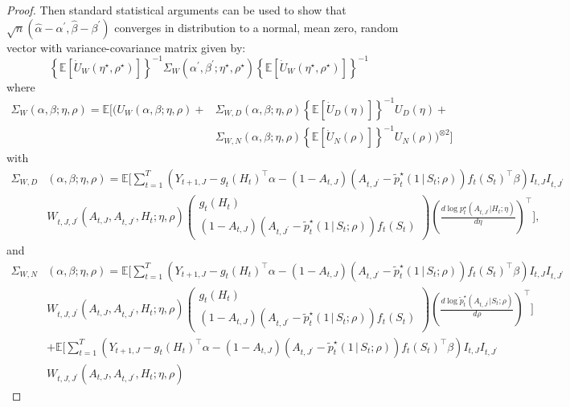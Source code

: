 \documentclass[supplementary, lineno]{biometrika}
\def\E{\mathbb{E}}
\def\given{\, | \,}
\begin{document}
\begin{proof}
Then standard statistical arguments can be used to show that $\sqrt{n}(\hat\alpha-\alpha^\prime, \hat\beta-\beta^\prime)$ converges in distribution to a normal, mean zero, random vector with variance-covariance matrix given by:
\begin{equation*}
    \left\{ \E \left[\dot U_W(\eta^\star, \rho^\star) \right]\right\}^{-1} \Sigma_W(\alpha^\prime,\beta^\prime;\eta^\star, \rho^\star) \left\{ \E \left[\dot U_W(\eta^\star, \rho^\star) \right]\right\}^{-1}
\end{equation*}
where
\begin{align*}
    \Sigma_W(\alpha,\beta;\eta, \rho) = \E \Big[\Big(U_W(\alpha,\beta;\eta, \rho) + &\Sigma_{W,D}(\alpha,\beta;\eta, \rho) \left\{\E[\dot U_D(\eta)] \right\}^{-1} U_D(\eta) + \nonumber \\ &\Sigma_{W,N}(\alpha,\beta;\eta, \rho)\left\{\E[\dot U_N(\rho)] \right\}^{-1} U_N(\rho) \Big)^ {\otimes 2} \Big]
\end{align*}
with
\begin{align*}
    \Sigma_{W,D}&(\alpha,\beta ; \eta, \rho)
    = \E \Big[ \sum_{t=1}^T \left( Y_{t+1,J} - g_t(H_t)^\top \alpha -  (1-A_{t,J})(A_{t,J^\prime} - \tilde p_t^\star (1 \given S_t;\rho) ) f_t (S_t)^\top \beta \right)I_{t,J}I_{t,J^\prime} \nonumber \\ &W_{t,J, J^\prime}(A_{t,J},A_{t,J^\prime},H_t; \eta,\rho)
    \begin{pmatrix}
  g_t(H_t) \\
  (1-A_{t,J})(A_{t,J^\prime} - \tilde {p}^\star_t (1 \given S_t;\rho) ) f_t (S_t)
\end{pmatrix}\left(\frac{d \log p^\star_t(A_{t,J^\prime}|H_t;\eta)}{d \eta} \right)^\top \Big],
\end{align*}
and
\begin{align*}
    \Sigma_{W,N}&(\alpha,\beta;\eta, \rho)
    = \E \Big[ \sum_{t=1}^T \left( Y_{t+1,J} - g_t(H_t)^\top \alpha -  (1-A_{t,J})(A_{t,J^\prime} - \tilde p_t^\star (1 \given S_t;\rho) ) f_t (S_t)^\top \beta \right)I_{t,J}I_{t,J^\prime} \nonumber \\ &W_{t,J, J^\prime}(A_{t,J},A_{t,J^\prime},H_t; \eta,\rho)
    \begin{pmatrix}
  g_t(H_t) \\
  (1-A_{t,J})(A_{t,J^\prime} - \tilde {p}^\star_t (1 \given S_t;\rho) ) f_t (S_t)
\end{pmatrix}\left(\frac{d \log \tilde p^\star_t(A_{t,J^\prime}|S_t;\rho)}{d \rho} \right)^\top \Big] \nonumber \\
&+\E \Big[ \sum_{t=1}^T \left( Y_{t+1,J} - g_t(H_t)^\top \alpha -  (1-A_{t,J})(A_{t,J^\prime} - \tilde p_t^\star (1 \given S_t;\rho) ) f_t (S_t)^\top \beta \right)I_{t,J}I_{t,J^\prime} \nonumber \\ &W_{t,J, J^\prime}(A_{t,J},A_{t,J^\prime},H_t; \eta,\rho)

\end{align*}
\end{proof}
\end{document}
